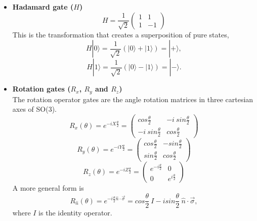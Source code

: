 \begin{itemize}
    \item \textbf{Hadamard gate ($H$)}
    \begin{equation}
        H = \frac1{\sqrt2} \left( \begin{array}{cc} 1 & 1 \\
                                                    1 & -1 \end{array} \right)
    \end{equation}
    This is the transformation that creates a superposition of pure states,
    \begin{equation}
        H|0\rangle = \frac{1}{\sqrt{2}} (|0\rangle + |1\rangle) = |+\rangle,
    \end{equation}
    \begin{equation}
        H|1\rangle = \frac{1}{\sqrt{2}} (|0\rangle - |1\rangle) = |-\rangle.
    \end{equation}
    
    \item \textbf{Rotation gates ($R_x$, $R_y$ and $R_z$)} \\
    The rotation operator gates are the angle rotation matrices in three cartesian axes of SO(3).
    \begin{equation}
        R_x(\theta) = e^{-iX\frac{\theta}{2}} = \left( \begin{array}{cc} cos\frac{\theta}{2} & -i \ sin\frac{\theta}{2} \\
        -i \ sin\frac{\theta}{2} & cos\frac{\theta}{2} \end{array} \right)
    \end{equation}
    \begin{equation}
        R_y(\theta) = e^{-iY\frac{\theta}{2}} = \left( \begin{array}{cc} cos\frac{\theta}{2} & - sin\frac{\theta}{2} \\
        sin\frac{\theta}{2} & cos\frac{\theta}{2} \end{array} \right)
    \end{equation}
    \begin{equation}
        R_z(\theta) = e^{-iZ\frac{\theta}{2}} = \left( \begin{array}{cc} e^{-i\frac{\theta}{2}} & 0 \\
        0 & e^{i\frac{\theta}{2}} \end{array} \right)
    \end{equation}
    A more general form is
    \begin{equation}
        R_{\hat{n}}(\theta) = e^{-i\frac{\theta}{2}\hat{n} \cdot \vec{\sigma}} = cos\frac{\theta}{2} \ I - i sin\frac{\theta}{2} \ \hat{n} \cdot \vec{\sigma},
    \end{equation}
    where $I$ is the identity operator.
    

\end{itemize}
